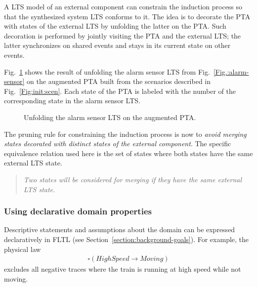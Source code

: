 A LTS model of an external component can constrain the induction process so that the synthesized system LTS conforms to it. The idea is to decorate the PTA with states of the external LTS by unfolding the latter on the PTA. Such decoration is performed by jointly visiting the PTA and the external LTS; the latter synchronizes on shared events and stays in its current state on other events.

Fig.~\ref{Fig.:alarm-unfolded-pta} shows the result of unfolding the alarm sensor LTS from Fig.~\ref{Fig.:alarm-sensor} on the augmented PTA built from the scenarios described in Fig.~\ref{Fig:init:scen}. Each state of the PTA is labeled with the number of the corresponding state in the alarm sensor LTS. 

\begin{figure}
\centering
{}
\caption{Unfolding the alarm sensor LTS on the augmented PTA\label{Fig.:alarm-unfolded-pta}.}
\end{figure}

The pruning rule for constraining the induction process is now to \emph{avoid merging states decorated with distinct states of the external component}. The specific equivalence relation used here is the set of states where both states have the same external LTS state. 

\begin{quote}
\emph{Two states will be considered for merging if they have the same external LTS state.}
\end{quote}


\subsubsection*{Using declarative domain properties}

Descriptive statements and assumptions about the domain can be expressed declaratively in FLTL (see Section~\ref{section:background-goals}). For example, the physical law
\begin{align*}
\square(HighSpeed \rightarrow Moving)
\end{align*}
\noindent excludes all negative traces where the train is running at high speed while not moving. 

